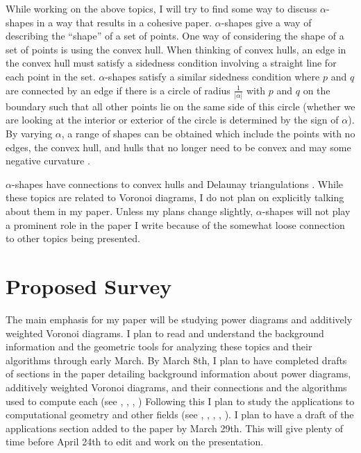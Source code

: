 \documentclass[a4paper]{article}
\begin{document}
While working on the above topics, I will try to find some way to discuss $\alpha$-shapes in a way that results in a cohesive paper. $\alpha$-shapes give
a way of describing the ``shape'' of a set of points. One way of considering the shape of a set of points is using the convex hull. When thinking of
convex hulls, an edge in the convex hull must satisfy a sidedness condition involving a straight line for each point in the set. $\alpha$-shapes satisfy a similar sidedness condition
where $p$ and $q$ are connected by an edge if there is a circle of radius $\frac{1}{|\alpha|}$ with $p$ and $q$ on the boundary such that all other
points lie on the same side of this circle (whether we are looking at the interior or exterior of the circle is determined by the sign of $\alpha$). By
varying $\alpha$, a range of shapes can be obtained which include the points with no edges, the convex hull, and hulls that no longer need to be
convex and may some negative curvature \cite{edelsbrunner_3d} \cite{edelsbrunner_alpha}.

$\alpha$-shapes have connections to convex hulls and Delaunay triangulations \cite{edelsbrunner_alpha}. While these topics are related to Voronoi
diagrams, I do not plan on explicitly talking about them in my paper. Unless my plans change slightly, $\alpha$-shapes will not play a prominent role
in the paper I write because of the somewhat loose connection to other topics being presented.

\section{Proposed Survey}

The main emphasis for my paper will be studying power diagrams and additively weighted Voronoi diagrams. I plan to read and understand the background
information and the geometric tools for analyzing these topics and their algorithms through early March. By March 8th, I plan to have completed drafts
of sections in the paper detailing background information about power diagrams, additively weighted Voronoi diagrams, and their connections and the
algorithms used to compute each (see \cite{aurenhammer_power}, \cite{aurenhammer_survey}, \cite{aurenhammer_additive}, \cite{fortune_sweepline})
Following this I plan to study the applications to computational geometry and other fields (see \cite{aurenhammer_discs}, \cite{brieden_clustering},
\cite{brieden_farmland}, \cite{imai_power}, \cite{fluids}). I plan to have a draft of the applications section added to the paper by March 29th. This
will give plenty of time before April 24th to edit and work on the presentation.

\printbibliography
\end{document}
